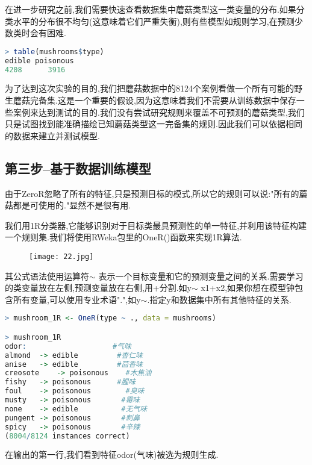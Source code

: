 \documentclass[11pt,a4paper,oneside]{book}
\begin{document}
在进一步研究之前,我们需要快速查看数据集中蘑菇类型这一类变量的分布.如果分类水平的分布很不均匀(这意味着它们严重失衡),则有些模型如规则学习,在预测少数类时会有困难.
\begin{lstlisting}[language=r]
> table(mushrooms$type)
edible poisonous 
4208      3916 
\end{lstlisting}

为了达到这次实验的目的,我们把蘑菇数据中的8124个案例看做一个所有可能的野生蘑菇完备集.这是一个重要的假设,因为这意味着我们不需要从训练数据中保存一些案例来达到测试的目的.我们没有尝试研究规则来覆盖不可预测的蘑菇类型,我们只是试图找到能准确描绘已知蘑菇类型这一完备集的规则.因此我们可以依据相同的数据来建立并测试模型.
\subsection{第三步--基于数据训练模型}
由于ZeroR忽略了所有的特征,只是预测目标的模式,所以它的规则可以说:"所有的蘑菇都是可使用的."显然不是很有用.

我们用1R分类器,它能够识别对于目标类最具预测性的单一特征,并利用该特征构建一个规则集.我们将使用RWeka包里的OneR()函数来实现1R算法.

\begin{figure}[H]
	\centering
	\texttt{[image: 22.jpg]}
\end{figure}

其公式语法使用运算符$\sim$ 表示一个目标变量和它的预测变量之间的关系.需要学习的类变量放在左侧,预测变量放在右侧,用+分割.如y$\sim$ x1+x2,如果你想在模型钟包含所有变量,可以使用专业术语".",如y$\sim$.指定y和数据集中所有其他特征的关系.
\begin{lstlisting}[language=r]
> mushroom_1R <- OneR(type ~ ., data = mushrooms)

> mushroom_1R
odor:                    #气味
almond	-> edible         #杏仁味
anise	-> edible         #茴香味
creosote	-> poisonous    #木焦油
fishy	-> poisonous      #腥味
foul	-> poisonous        #臭味
musty	-> poisonous       #霉味   
none	-> edible          #无气味
pungent	-> poisonous       #刺鼻
spicy	-> poisonous       #辛辣
(8004/8124 instances correct)
\end{lstlisting}
在输出的第一行,我们看到特征odor(气味)被选为规则生成.
\end{document}
